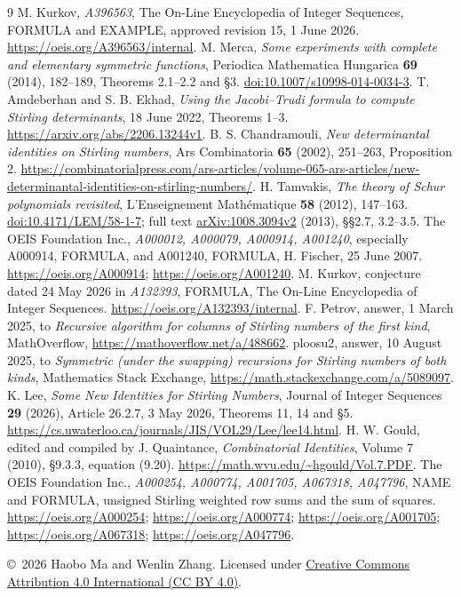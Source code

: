 \documentclass[11pt]{article}
\begin{document}
\begin{thebibliography}{9}
 M. Kurkov, \emph{A396563}, The On-Line Encyclopedia of Integer
Sequences, FORMULA and EXAMPLE, approved revision 15, 1 June 2026.
\url{https://oeis.org/A396563/internal}.
 M. Merca, \emph{Some experiments with complete and elementary
symmetric functions}, Periodica Mathematica Hungarica \textbf{69} (2014),
182--189, Theorems 2.1--2.2 and \S3.
\href{https://doi.org/10.1007/s10998-014-0034-3}{doi:10.1007/s10998-014-0034-3}.
 T. Amdeberhan and S. B. Ekhad,
\emph{Using the Jacobi--Trudi formula to compute Stirling determinants},
18 June 2022, Theorems 1--3.
\url{https://arxiv.org/abs/2206.13244v1}.
 B. S. Chandramouli,
\emph{New determinantal identities on Stirling numbers},
Ars Combinatoria \textbf{65} (2002), 251--263, Proposition 2.
\url{https://combinatorialpress.com/ars-articles/volume-065-ars-articles/new-determinantal-identities-on-stirling-numbers/}.
 H. Tamvakis, \emph{The theory of Schur polynomials revisited},
L'Enseignement Math\'ematique \textbf{58} (2012), 147--163.
\href{https://doi.org/10.4171/LEM/58-1-7}{doi:10.4171/LEM/58-1-7};
full text \href{https://arxiv.org/abs/1008.3094v2}{arXiv:1008.3094v2} (2013),
\S\S2.7, 3.2--3.5.
 The OEIS Foundation Inc., \emph{A000012, A000079, A000914,
A001240}, especially A000914, FORMULA, and A001240, FORMULA,
H. Fischer, 25 June 2007.
\url{https://oeis.org/A000914}; \url{https://oeis.org/A001240}.
 M. Kurkov, conjecture dated 24 May 2026 in \emph{A132393},
FORMULA, The On-Line Encyclopedia of Integer Sequences.
\url{https://oeis.org/A132393/internal}.
 F. Petrov, answer, 1 March 2025, to
\emph{Recursive algorithm for columns of Stirling numbers of the first kind},
MathOverflow, \url{https://mathoverflow.net/a/488662}.
ploosu2, answer, 10 August 2025, to \emph{Symmetric (under the swapping)
recursions for Stirling numbers of both kinds}, Mathematics Stack Exchange,
\url{https://math.stackexchange.com/a/5089097}.
 K. Lee, \emph{Some New Identities for Stirling Numbers},
Journal of Integer Sequences \textbf{29} (2026), Article 26.2.7,
3 May 2026, Theorems 11, 14 and \S5.
\url{https://cs.uwaterloo.ca/journals/JIS/VOL29/Lee/lee14.html}.
 H. W. Gould, edited and compiled by J. Quaintance,
\emph{Combinatorial Identities}, Volume 7 (2010),
\S9.3.3, equation (9.20).
\url{https://math.wvu.edu/~hgould/Vol.7.PDF}.
 The OEIS Foundation Inc., \emph{A000254, A000774,
A001705, A067318, A047796}, NAME and FORMULA, unsigned Stirling weighted
row sums and the sum of squares.
\url{https://oeis.org/A000254}; \url{https://oeis.org/A000774};
\url{https://oeis.org/A001705}; \url{https://oeis.org/A067318};
\url{https://oeis.org/A047796}.
\end{thebibliography}
\smallskip\noindent\small
\copyright\ 2026 Haobo Ma and Wenlin Zhang. Licensed under
\href{https://creativecommons.org/licenses/by/4.0/}{Creative Commons Attribution 4.0 International (CC BY 4.0)}.
\end{document}
